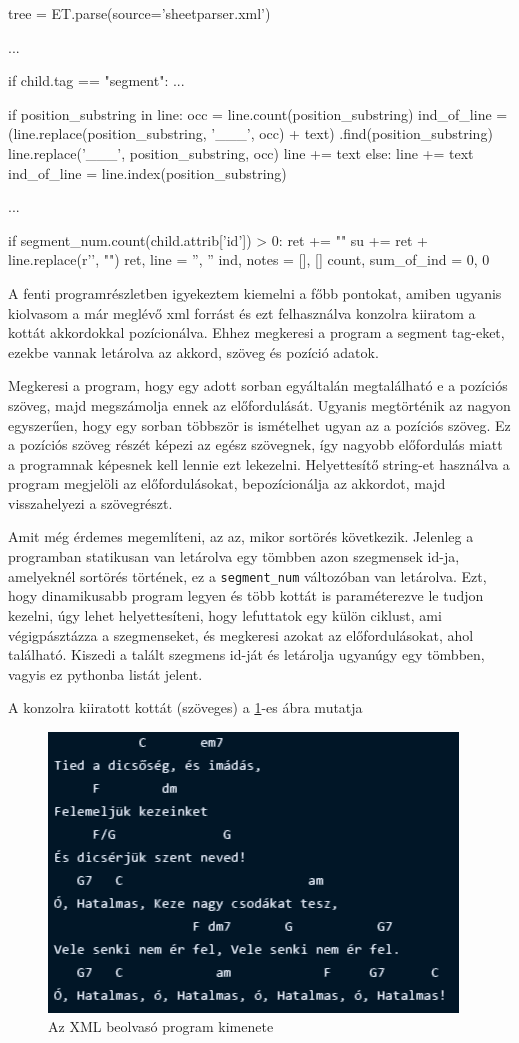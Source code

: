 \begin{python}
tree = ET.parse(source='sheetparser.xml')

...

if child.tag == "segment":
	...
	
  if position_substring in line:
    occ = line.count(position_substring)
    ind_of_line = (line.replace(position_substring, '___', occ) + text)
      .find(position_substring)
    line.replace('___', position_substring, occ)
    line += text
  else:
    line += text
    ind_of_line = line.index(position_substring)
	            
     ...
     
  if segment_num.count(child.attrib['id']) > 0:
    ret += "\n"
    su += ret + line.replace(r'\n', "\n")
    ret, line = '', ''
    ind, notes = [], []
    count, sum_of_ind = 0, 0
\end{python}

A fenti programrészletben igyekeztem kiemelni a főbb pontokat, amiben ugyanis kiolvasom a már meglévő xml forrást és ezt felhasználva konzolra kiiratom a kottát akkordokkal pozícionálva. Ehhez megkeresi a program a segment tag-eket, ezekbe vannak letárolva az akkord, szöveg és pozíció adatok. 

Megkeresi a program, hogy egy adott sorban egyáltalán megtalálható e a pozíciós szöveg, majd megszámolja ennek az előfordulását. Ugyanis megtörténik az nagyon egyszerűen, hogy egy sorban többször is ismételhet ugyan az a pozíciós szöveg. Ez a pozíciós szöveg részét képezi az egész szövegnek, így nagyobb előfordulás miatt a programnak képesnek kell lennie ezt lekezelni. Helyettesítő string-et használva a program megjelöli az előfordulásokat, bepozícionálja az akkordot, majd visszahelyezi a szövegrészt.

Amit még érdemes megemlíteni, az az, mikor sortörés következik. Jelenleg a programban statikusan van letárolva egy tömbben azon szegmensek id-ja, amelyeknél sortörés történek, ez a \texttt{segment\_num} változóban van letárolva. Ezt, hogy dinamikusabb program legyen és több kottát is paraméterezve le tudjon kezelni, úgy lehet helyettesíteni, hogy lefuttatok egy külön ciklust, ami végigpásztázza a szegmenseket, és megkeresi azokat az előfordulásokat, ahol \texttt{} található. Kiszedi a talált szegmens id-ját és letárolja ugyanúgy egy tömbben, vagyis ez pythonba listát jelent.

A konzolra kiiratott kottát (szöveges) a \ref{fig:output1}-es ábra mutatja

\begin{figure}[h]
	\includegraphics[scale=1]{images/output_tied.png}
	\caption{Az XML beolvasó program kimenete}
	\label{fig:output1}
\end{figure}
